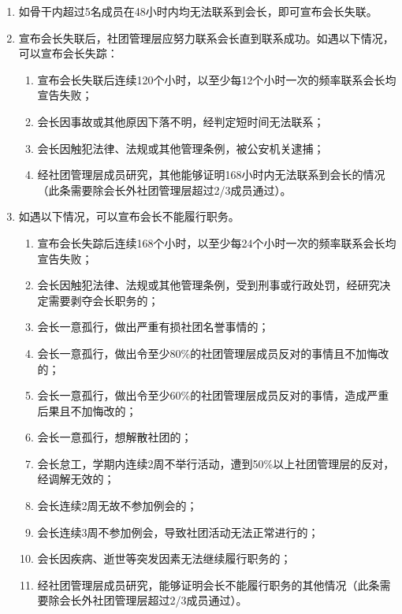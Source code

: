 \begin{enumerate}[resume]
    \item 如骨干内超过5名成员在48小时内均无法联系到会长，即可宣布会长失联。
    
    \item 宣布会长失联后，社团管理层应努力联系会长直到联系成功。如遇以下情况，可以宣布会长失踪：
    
    \begin{enumerate}
        \item 宣布会长失联后连续120个小时，以至少每12个小时一次的频率联系会长均宣告失败；
        \item 会长因事故或其他原因下落不明，经判定短时间无法联系；
        \item 会长因触犯法律、法规或其他管理条例，被公安机关逮捕；
        \item 经社团管理层成员研究，其他能够证明168小时内无法联系到会长的情况（此条需要除会长外社团管理层超过2/3成员通过）。
    \end{enumerate}

    \item 如遇以下情况，可以宣布会长不能履行职务。
    
    \begin{enumerate}
        \item 宣布会长失踪后连续168个小时，以至少每24个小时一次的频率联系会长均宣告失败；
        \item 会长因触犯法律、法规或其他管理条例，受到刑事或行政处罚，经研究决定需要剥夺会长职务的；
        \item 会长一意孤行，做出严重有损社团名誉事情的；
        \item 会长一意孤行，做出令至少80\%的社团管理层成员反对的事情且不加悔改的；
        \item 会长一意孤行，做出令至少60\%的社团管理层成员反对的事情，造成严重后果且不加悔改的；
        \item 会长一意孤行，想解散社团的；
        \item 会长怠工，学期内连续2周不举行活动，遭到50\%以上社团管理层的反对，经调解无效的；
        \item 会长连续2周无故不参加例会的；
        \item 会长连续3周不参加例会，导致社团活动无法正常进行的；
        \item 会长因疾病、逝世等突发因素无法继续履行职务的；
        \item 经社团管理层成员研究，能够证明会长不能履行职务的其他情况（此条需要除会长外社团管理层超过2/3成员通过）。
    \end{enumerate}
    

\end{enumerate}
